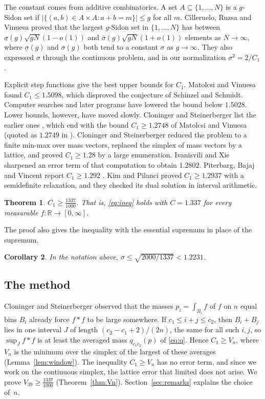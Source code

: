 \documentclass[11pt]{amsart}
\newtheorem{theorem}{Theorem}[section]
\newtheorem{corollary}[theorem]{Corollary}
\theoremstyle{definition}
\theoremstyle{remark}
\numberwithin{equation}{section}
\newcommand{\R}{\mathbb{R}}
\newcommand{\LAM}{\tfrac{1337}{1000}}
\newcommand{\Cone}{1.337}
\newcommand{\Nbins}{39}
\newcommand{\SidonSq}{2000/1337}
\newcommand{\SidonVal}{1.2231}
\begin{document}
The constant comes from additive combinatorics. A set $A\subseteq\{1,\dots,N\}$ is a $g$-Sidon set if $|\{(a,b)\in A\times A:a+b=m\}|\le g$ for all $m$. Cilleruelo, Ruzsa and Vinuesa \cite{CRV10} proved that the largest $g$-Sidon set in $\{1,\dots,N\}$ has between $\underline\sigma(g)\sqrt{gN}(1-o(1))$ and $\overline\sigma(g)\sqrt{gN}(1+o(1))$ elements as $N\to\infty$, where $\underline\sigma(g)$ and $\overline\sigma(g)$ both tend to a constant $\sigma$ as $g\to\infty$. They also expressed $\sigma$ through the continuous problem, and in our normalization $\sigma^2=2/C_1$ \cite[Section 1.2]{CS17}.

Explicit step functions give the best upper bounds for $C_1$. Matolcsi and Vinuesa \cite{MV10} found $C_1\le 1.5098$, which disproved the conjecture of Schinzel and Schmidt. Computer searches \cite{AE25,GGTW25} and later programs \cite{EA26,Jana26} have lowered the bound below $1.5028$. Lower bounds, however, have moved slowly. Cloninger and Steinerberger list the earlier ones \cite[Section 1.2]{CS17}, which end with the bound $C_1\ge1.2748$ of Matolcsi and Vinuesa \cite{MV10} (quoted as $1.2749$ in \cite{CS17}). Cloninger and Steinerberger reduced the problem to a finite min-max over mass vectors, replaced the simplex of mass vectors by a lattice, and proved $C_1\ge 1.28$ by a large enumeration. Ivanisvili and Xie \cite{IX26} sharpened an error term of that computation to obtain $1.2802$. Piterbarg, Bajaj and Vincent report $C_1\ge1.292$ \cite{PBV26}. Kim and Pilanci \cite{KP26} proved $C_1\ge 1.2937$ with a semidefinite relaxation, and they checked its dual solution in interval arithmetic.

\begin{theorem}\label{thm:main}
$C_1\ge\LAM$. That is, \eqref{eq:ineq} holds with $C=\Cone$ for every measurable $f\colon\R\to[0,\infty]$.
\end{theorem}

The proof also gives the inequality with the essential supremum in place of the supremum.

\begin{corollary}\label{cor:sidon}
In the notation above, $\sigma\le\sqrt{\SidonSq}<\SidonVal$.
\end{corollary}

\subsection*{The method}
Cloninger and Steinerberger observed that the masses $p_i=\int_{B_i}f$ of $f$ on $n$ equal bins $B_i$ already force $f*f$ to be large somewhere. If $c_1\le i+j\le c_2$, then $B_i+B_j$ lies in one interval $J$ of length $(c_2-c_1+2)/(2n)$, the same for all such $i,j$, so $\sup_J f*f$ is at least the averaged mass $q_{c_1c_2}(p)$ of \eqref{eq:q}. Hence $C_1\ge V_n$, where $V_n$ is the minimum over the simplex of the largest of these averages (Lemma~\ref{lem:window}). The inequality $C_1\ge V_n$ has no error term, and since we work on the continuous simplex, the lattice error that limited \cite{CS17} does not arise. We prove $V_{\Nbins}\ge\LAM$ (Theorem~\ref{thm:Vn}). Section~\ref{sec:remarks} explains the choice of~$n$.
\end{document}
